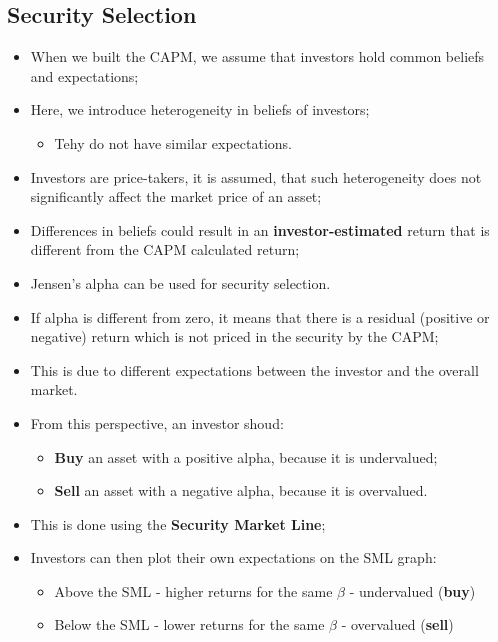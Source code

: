 \documentclass[11pt,a4paper]{report}
\begin{document}
\subsection{Security Selection}
\begin{itemize}
    \item When we built the CAPM, we assume that investors hold common beliefs and expectations;
    \item Here, we introduce heterogeneity in beliefs of investors;
    \begin{itemize}
        \item Tehy do not have similar expectations.
    \end{itemize}
    \item Investors are price-takers, it is assumed, that such heterogeneity does not significantly affect the market price of an asset;
    \item Differences in beliefs could result in an \textbf{investor-estimated} return that is different from the CAPM calculated return;
    \item Jensen's alpha can be used for security selection.
    \item If alpha is different from zero, it means that there is a residual (positive or negative) return which is not priced in the security by the CAPM;
    \item This is due to different expectations between the investor and the overall market.
    \item From this perspective, an investor shoud:
    \begin{itemize}
        \item \textbf{Buy} an asset with a positive alpha, because it is undervalued;
        \item \textbf{Sell} an asset with a negative alpha, because it is overvalued.
    \end{itemize}
    \item This is done using the \textbf{Security Market Line};
    \item Investors can then plot their own expectations on the SML graph:
    \begin{itemize}
        \item Above the SML - higher returns for the same $\beta$ - undervalued (\textbf{buy})
        \item Below the SML - lower returns for the same $\beta$ - overvalued (\textbf{sell})
    \end{itemize}
    \begin{figure}[h]

\end{figure}
\end{itemize}
\end{document}
